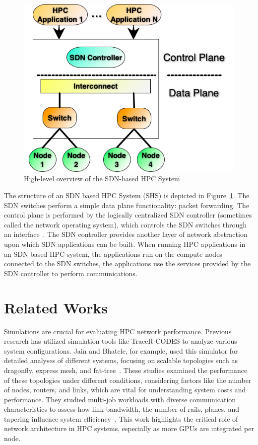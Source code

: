 \begin{figure}[h!]
  \centering
  \includegraphics[width=0.8\columnwidth]{./figs/Fig1.png}
  \caption{High-level overview of the SDN-based HPC System}
  \label{fig:sdn_hpc}
\end{figure}

The structure of an SDN based HPC System (SHS) is depicted in Figure~\ref{fig:sdn_hpc}.
The SDN switches perform a simple data plane functionality: packet forwarding. The
control plane is performed by the logically centralized
SDN controller (sometimes called the network operating system), which controls
the SDN switches through an interface~\cite{benzekki2016software}.
The SDN controller provides another layer of network abstraction upon which SDN
applications can be built. When running HPC applications in an SDN based HPC system,
the applications run on the compute nodes connected to the SDN switches,
the applications use the services provided by the SDN controller to perform
communications.




\clearpage
\section{Related Works}

Simulations are crucial for evaluating HPC network performance. 
Previous research has utilized simulation tools like TraceR-CODES to analyze various system configurations. 
Jain and Bhatele, for example, used this simulator for detailed analyses 
of different systems, focusing on scalable topologies such as dragonfly, express mesh, and fat-tree~\cite{bhatele2019analyzing}. 
These studies examined the performance of these topologies under different conditions, 
considering factors like the number of nodes, routers, and links, 
which are vital for understanding system costs and performance.
They studied multi-job workloads with diverse communication characteristics 
to assess how link bandwidth, the number of rails, planes, and tapering 
influence system efficiency~\cite{jain2017predicting}. This work highlights the critical role of network 
architecture in HPC systems, especially as more GPUs are integrated per node.


